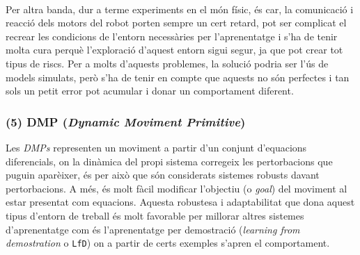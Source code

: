 \documentclass[12pt,a4paper,final,twoside]{article}
\begin{document}
\paragraph{}Per altra banda, dur a terme experiments en el món físic, és car, la comunicació i reacció dels motors del robot porten sempre un cert retard, pot ser complicat el recrear les condicions de l'entorn necessàries per l'aprenentatge i s'ha de tenir molta cura perquè l'exploració d'aquest entorn sigui segur, ja que pot crear tot tipus de riscs. Per a molts d'aquests problemes, la solució podria ser l'ús de models simulats, però s'ha de tenir en compte que aquests no són perfectes i tan sols un petit error pot acumular i donar un comportament diferent.

\subsubsection*{(5) DMP (\textit{Dynamic Moviment Primitive})}
\label{DMP-estat-de-l'art}


Les \textit{DMPs} representen un moviment a partir d'un conjunt d'equacions diferencials, on la dinàmica del propi sistema corregeix les pertorbacions que puguin aparèixer, és per això que són considerats sistemes robusts davant pertorbacions. A més, és molt fàcil modificar l'objectiu (o \textit{goal}) del moviment al estar presentat com equacions. Aquesta robustesa i adaptabilitat que dona aquest tipus d'entorn de treball és molt favorable per millorar altres sistemes d'aprenentatge com és l'aprenentatge per demostració (\textit{learning from demostration} o \texttt{LfD}) on a partir de certs exemples s'apren el comportament.
\end{document}
